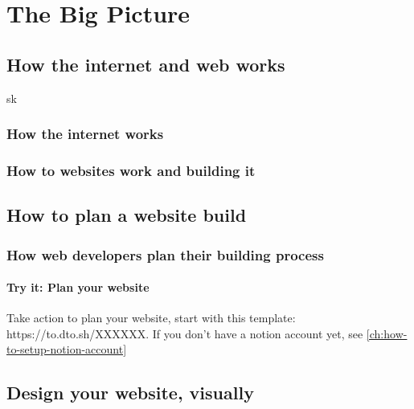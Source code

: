\part{The Big Picture}\label{part:the-big-picture}


\chapter{How the internet and web works}\label{ch:how-the-internet-and-web-works}sk



\section{How the internet works}\label{sec:how-the-internet-works}


\section{How to websites work and building it}\label{sec:how-to-websites-work-and-building-it}


\chapter{How to plan a website build}\label{ch:how-to-plan-a-website-build}


\section{How web developers plan their building process}\label{sec:how-web-developers-plan-their-building-process}

\subsection{Try it: Plan your website}\label{subsec:plan-your-website}
Take action to plan your website, start with this template: https://to.dto.sh/XXXXXX. If you don't have a notion account yet, see \cref{ch:how-to-setup-notion-account}


\chapter{Design your website, visually}\label{ch:design-your-website-visually}


